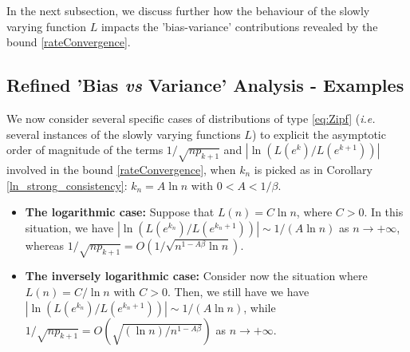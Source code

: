 \documentclass[sn-mathphys-ay]{sn-jnl}%
\begin{document}

In the next subsection, we discuss further how the behaviour of the slowly varying
function $L$ impacts the 'bias-variance' contributions revealed by the bound
\eqref{rateConvergence}.

\subsection{Refined 'Bias \textit{vs} Variance' Analysis - Examples}\label{subsec:examples}

We now consider several specific cases of distributions of type \eqref{eq:Zipf}
(\textit{i.e.} several instances of the slowly varying functions $L$) to explicit the
asymptotic order of magnitude of the terms $1/\sqrt{np_{k+1}}$ and $|
    \ln(L(e^{k})/L(e^{k+1}))|$ involved in the bound \eqref{rateConvergence}, when \(k_n\) is
picked as in Corollary \ref{ln_strong_consistency}: \(k_n=A\ln n\) with \(0<A<1/\beta\).

\begin{itemize}
    \item \textbf{The logarithmic case:} Suppose that \(L(n)=C\ln{n}\), where $C>0$. In this
          situation, we have $| \ln(L(e^{k_n})/L(e^{k_n+1}))|\sim 1/(A\ln n)$ as $n\to+\infty$,
          whereas $1/\sqrt{np_{k+1}}=O(1/\sqrt{n^{1-A\beta}\ln n})$.
    \item \textbf{The inversely logarithmic case:} Consider now the situation where
          $L(n)=C/\ln{n}$ with $C>0$. Then, we still have we have
          $|\ln(L(e^{k_n})/L(e^{k_n+1}))|\sim 1/(A\ln n)$, while $1/\sqrt{np_{k+1}}=O(\sqrt{(\ln
              n)/n^{1-A\beta}})$ as $n\to+\infty$.
\end{itemize}
\end{document}
